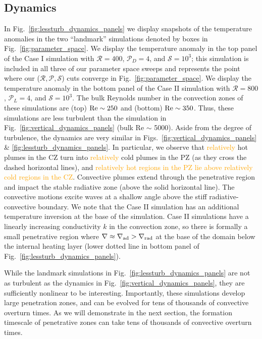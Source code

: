 \documentclass[twocolumn, linenumbers]{aastex631}
\newcommand{\gradrad}{\ensuremath{\nabla_{\rm{rad}}}}
\newcommand{\gradad}{\ensuremath{\nabla_{\rm{ad}}}}
\newcommand{\justgrad}{\ensuremath{\nabla}}
\newcommand{\mP}{\ensuremath{\mathcal{P}}}
\newcommand{\mR}{\ensuremath{\mathcal{R}}}
\newcommand{\mS}{\ensuremath{\mathcal{S}}}
\newcommand{\editone}[1]{\textcolor{orange}{#1}}
\begin{document}
\subsection{Dynamics}
In Fig.~\ref{fig:lessturb_dynamics_panels} we display snapshots of the temperature anomalies in the two ``landmark'' simulations denoted by boxes in Fig.~\ref{fig:parameter_space}.
We display the temperature anomaly in the top panel of the Case I simulation with $\mR = 400$, $\mP_D = 4$, and $\mS = 10^3$; this simulation is included in all three of our parameter space sweeps and represents the point where our ($\mR, \mP, \mS$) cuts converge  in Fig.~\ref{fig:parameter_space}.
We display the temperature anomaly in the bottom panel of the Case II simulation with $\mR = 800$, $\mP_L = 4$, and $\mS = 10^3$.
The bulk Reynolds number in the convection zones of these simulations are (top) $\rm{Re} \sim 250$ and (bottom) $\rm{Re} \sim 350$.
Thus, these simulations are less turbulent than the simulation in Fig.~\ref{fig:vertical_dynamics_panels} (bulk Re $\sim$ 5000).
Aside from the degree of turbulence, the dynamics are very similar in Figs.~\ref{fig:vertical_dynamics_panels} \& \ref{fig:lessturb_dynamics_panels}.
In particular, we observe that \editone{relatively} hot plumes in the CZ turn into \editone{relatively} cold plumes in the PZ (as they cross the dashed horizontal lines), and \editone{relatively hot regions in the PZ lie above relatively cold regions in the CZ}.
Convective plumes extend through the penetrative region and impact the stable radiative zone (above the solid horizontal line).
The convective motions excite waves at a shallow angle above the stiff radiative-convective boundary.
We note that the Case II simulation has an additional temperature inversion at the base of the simulation.
Case II simulations have a linearly increasing conductivity $k$ in the convection zone, so there is formally a small penetrative region where $\justgrad \approx \gradad > \gradrad$ at the base of the domain below the internal heating layer (lower dotted line in bottom panel of Fig.~\ref{fig:lessturb_dynamics_panels}).

While the landmark simulations in Fig.~\ref{fig:lessturb_dynamics_panels} are not as turbulent as the dynamics in Fig.~\ref{fig:vertical_dynamics_panels}, they are sufficiently nonlinear to be interesting.
Importantly, these simulations develop large penetration zones, and can be evolved for tens of thousands of convective overturn times.
As we will demonstrate in the next section, the formation timescale of penetrative zones can take tens of thousands of convective overturn times.
\end{document}
